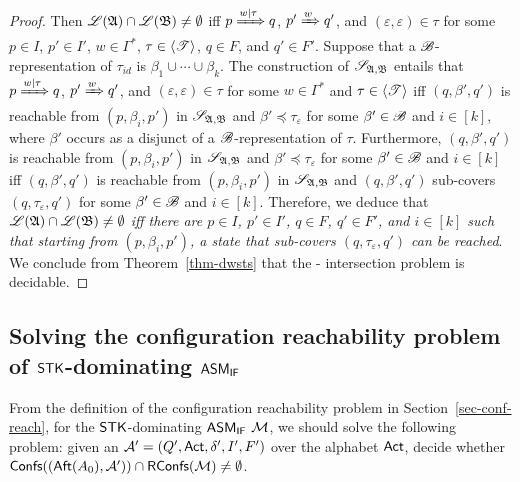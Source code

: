 \begin{proof}
Then ${\mathscr{L} }({\mathfrak{A} }) \cap {\mathscr{L} }({\mathfrak{B} }) \neq \emptyset$ iff $p \xRightarrow{w | \tau} q$, $p' \xRightarrow{w} q'$, and $(\varepsilon, \varepsilon) \in \tau$ for some $p \in I$, $p'\in I'$, $w \in \Gamma^*$, $\tau \in \langle {\mathscr{T} } \rangle$, $q \in F$, and $q' \in F'$. Suppose that a ${\mathscr{B} }$-representation of $\tau_{id}$ is $\beta_1 \cup \cdots \cup \beta_k$. 
The construction of $\mathscr{S}_{{\mathfrak{A} },{\mathfrak{B} }}$ entails that $p \xRightarrow{w | \tau} q$, $p' \xRightarrow{w} q'$, and $(\varepsilon, \varepsilon) \in \tau$ for some $w \in \Gamma^*$  and $\tau \in \langle {\mathscr{T} } \rangle$  iff $(q, \beta', q')$ is reachable from $(p, \beta_i, p')$ in $\mathscr{S}_{{\mathfrak{A} },{\mathfrak{B} }}$ and $\beta' \preceq \tau_\varepsilon$ for some $\beta' \in {\mathscr{B} }$ and $i \in [k]$, where $\beta'$ occurs as a disjunct of a ${\mathscr{B} }$-representation of $\tau$. 
%
Furthermore, $(q, \beta', q')$ is reachable from $(p, \beta_i, p')$ in $\mathscr{S}_{{\mathfrak{A} },{\mathfrak{B} }}$ and $\beta' \preceq \tau_\varepsilon$ for some $\beta' \in {\mathscr{B} }$ and $i \in [k]$ iff $(q, \beta', q')$ is reachable from $(p, \beta_i, p')$ in $\mathscr{S}_{{\mathfrak{A} },{\mathfrak{B} }}$ and $(q, \beta', q')$ sub-covers $(q, \tau_\varepsilon, q')$ for some $\beta' \in {\mathscr{B} }$ and $i \in [k]$. Therefore, we deduce that \emph{${\mathscr{L} }({\mathfrak{A} }) \cap {\mathscr{L} }({\mathfrak{B} }) \neq \emptyset$ iff there are $p \in I$, $p' \in I'$, $q \in F$, $q' \in F'$, and $i \in [k]$ such that starting from $(p, \beta_i, p')$, a state that sub-covers $(q, \tau_\varepsilon, q')$ can be reached}.
We conclude from Theorem~\ref{thm-dwsts} that the {\WOTrNFA}-{\NFA} intersection problem is decidable.
\end{proof}


\subsection{Solving the configuration reachability problem of ${\sf STK}$-dominating $\textsf{ASM}_\textsf{IF}$}\label{sec-ifamass-reach}

From the definition of the configuration reachability problem in Section~\ref{sec-conf-reach}, for the ${\sf STK}$-dominating $\textsf{ASM}_\textsf{IF}$ ${\mathcal{M} }$, we should solve the following problem: given an {\NFA} ${\mathcal{A} }' = (Q', {\sf Act}, \delta', I', F')$ over the alphabet ${\sf Act}$, decide whether ${\mathsf{Confs} }(({\sf Aft}(A_0), {\mathcal{A} }')) \cap \mathsf{RConfs}({\mathcal{M} }) \neq \emptyset$. 

